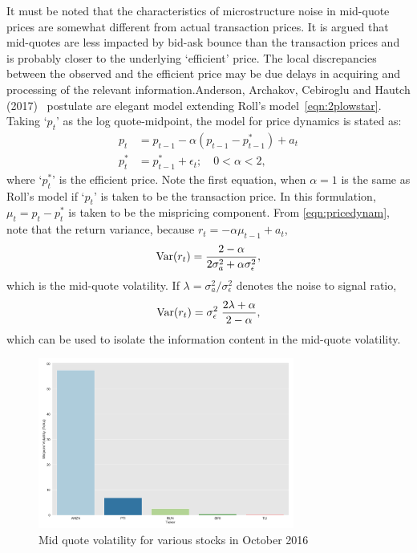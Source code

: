 It must be noted that the characteristics of microstructure noise in mid-quote prices are somewhat different from actual transaction prices. It is argued that mid-quotes are less impacted by bid-ask bounce than the transaction prices and is probably closer to the underlying `efficient' price. The local discrepancies between the observed and the efficient price may be due delays in acquiring and processing of the relevant information.Anderson, Archakov, Cebiroglu and Hautch (2017)~\cite{archcebha17} postulate are elegant model extending Roll's model~\ref{eqn:2plowstar}. Taking `$p_t$' as the log quote-midpoint, the model for price dynamics is stated as:
	\begin{equation} \label{eqn:pricedynam}
	\begin{split}
	p_t&= p_{t-1} - \alpha (p_{t-1} - p_{t-1}^*) + a_t \\
	p_t^*&= p_{t-1}^* + \epsilon_t; \quad 0<\alpha<2,
	\end{split}
	\end{equation}
where `$p_t^*$' is the efficient price. Note the first equation, when $\alpha=1$ is the same as Roll's model if `$p_t$' is taken to be the transaction price. In this formulation, $\mu_t= p_t - p_t^*$ is taken to be the mispricing component. From \eqref{eqn:pricedynam}, note that the return variance, because $r_t= -\alpha \mu_{t-1} + a_t$,
	\[
	\operatorname{Var}(r_t)= \dfrac{2-\alpha} {2 \sigma_a^2 + \alpha \sigma_\epsilon^2},
	\]
which is the mid-quote volatility. If $\lambda= \sigma_a^2/\sigma_\epsilon^2$ denotes the noise to signal ratio,
	\begin{equation} \label{eqn:signalrationoise}
	\Var(r_t)= \sigma_\epsilon^2 \; \dfrac{2\lambda + \alpha}{2-\alpha},
	\end{equation}
which can be used to isolate the information content in the mid-quote volatility. 


	\begin{figure}[!ht]
	\centering
	\includegraphics[width=0.75\textwidth]{chapters/chapter_trade_data_models/figures/mid_vol.png} 
	\caption{Mid quote volatility for various stocks in October 2016\label{fig:mid_vol}}
	\end{figure}


